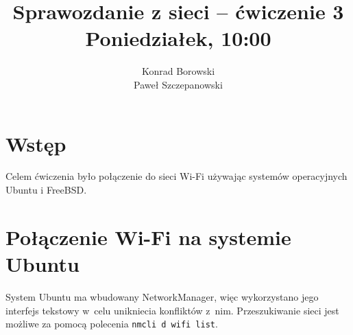 \documentclass[a4paper,11pt]{article}
\title{Sprawozdanie z sieci -- ćwiczenie 3\\Poniedziałek, 10:00}
\author{Konrad Borowski\\Paweł Szczepanowski}
\begin{document}
\thispagestyle{empty}                   %

\maketitle

\section{Wstęp}

Celem ćwiczenia było połączenie do sieci Wi-Fi używając systemów
operacyjnych Ubuntu i FreeBSD.

\section{Połączenie Wi-Fi na systemie Ubuntu}

System Ubuntu ma wbudowany NetworkManager, więc wykorzystano jego interfejs
tekstowy w~celu unikniecia konfliktów z~nim. Przeszukiwanie sieci jest
możliwe za pomocą polecenia \verb|nmcli d wifi list|.
\end{document}

